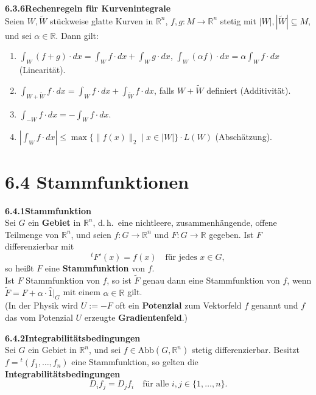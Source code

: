 \documentclass[a4paper,12pt]{article}
\newcommand{\gentry}[3]{%
  \noindent\textbf{#1\quad #2}\nopagebreak\\[0.2em]
  #3\par\smallskip
}
\begin{document}
\gentry{6.3.6}{Rechenregeln für Kurvenintegrale}{%
  Seien $W, \widetilde{W}$ stückweise glatte Kurven in $\mathbb{R}^n$,
  $f, g : M \longrightarrow \mathbb{R}^n$ stetig mit $|W|, |\widetilde{W}| \subseteq M$,
  und sei $\alpha \in \mathbb{R}$. Dann gilt:
  \begin{enumerate}[label=(\roman*),topsep=2pt,itemsep=1pt]
    \item $\displaystyle \int_W (f+g) \cdot dx = \int_W f \cdot dx + \int_W g \cdot dx$,
          \quad $\displaystyle \int_W (\alpha f) \cdot dx = \alpha \int_W f \cdot dx$
          \hfill (Linearität).
    \item $\displaystyle \int_{W+\widetilde{W}} f \cdot dx = \int_W f \cdot dx + \int_{\widetilde{W}} f \cdot dx$,
          falls $W + \widetilde{W}$ definiert \hfill (Additivität).
    \item $\displaystyle \int_{-W} f \cdot dx = -\int_W f \cdot dx$.
    \item $\displaystyle \left|\int_W f \cdot dx\right| \leq \max\{\|f(x)\|_2 \mid x \in |W|\} \cdot L(W)$
          \hfill (Abschätzung).
  \end{enumerate}
}

\section*{6.4 \quad Stammfunktionen}

\gentry{6.4.1}{Stammfunktion}{%
  Sei $G$ ein \textbf{Gebiet} in $\mathbb{R}^n$, d.\,h.\ eine nichtleere, zusammenhängende,
  offene Teilmenge von $\mathbb{R}^n$, und seien $f : G \longrightarrow \mathbb{R}^n$ und
  $F : G \longrightarrow \mathbb{R}$ gegeben. Ist $F$ differenzierbar mit
  \[
    {}^t F'(x) = f(x) \quad \text{für jedes } x \in G,
  \]
  so heißt $F$ eine \textbf{Stammfunktion} von $f$.\\
  Ist $F$ Stammfunktion von $f$, so ist $\widetilde{F}$ genau dann eine Stammfunktion von $f$,
  wenn $\widetilde{F} = F + \alpha \cdot \widehat{1}|_G$ mit einem $\alpha \in \mathbb{R}$ gilt.\\
  (In der Physik wird $U := -F$ oft ein \textbf{Potenzial} zum Vektorfeld $f$ genannt und
  $f$ das vom Potenzial $U$ erzeugte \textbf{Gradientenfeld}.)
}

\gentry{6.4.2}{Integrabilitätsbedingungen}{%
  Sei $G$ ein Gebiet in $\mathbb{R}^n$, und sei $f \in \mathrm{Abb}(G, \mathbb{R}^n)$ stetig
  differenzierbar. Besitzt $f = {}^t(f_1, \ldots, f_n)$ eine Stammfunktion, so gelten die
  \textbf{Integrabilitätsbedingungen}
  \[
    D_i f_j = D_j f_i \quad \text{für alle } i, j \in \{1, \ldots, n\}.
  \]
}
\end{document}
